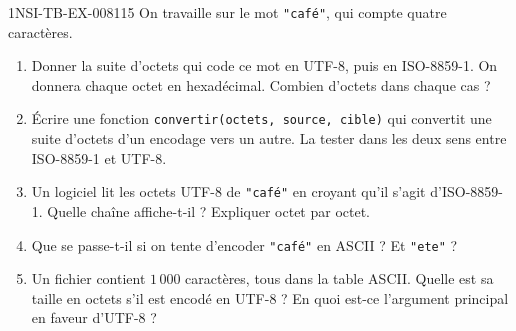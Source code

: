 \begin{exercice}{1NSI-TB-EX-008}{1}{15}
On travaille sur le mot \lstinline{"café"}, qui compte quatre caractères.
\begin{enumerate}
  \item Donner la suite d'octets qui code ce mot en UTF-8, puis en
    ISO-8859-1. On donnera chaque octet en hexadécimal. Combien d'octets dans
    chaque cas ?
  \item Écrire une fonction \lstinline{convertir(octets, source, cible)} qui
    convertit une suite d'octets d'un encodage vers un autre. La tester dans les
    deux sens entre ISO-8859-1 et UTF-8.
  \item Un logiciel lit les octets UTF-8 de \lstinline{"café"} en croyant qu'il
    s'agit d'ISO-8859-1. Quelle chaîne affiche-t-il ? Expliquer octet par octet.
  \item Que se passe-t-il si on tente d'encoder \lstinline{"café"} en ASCII ?
    Et \lstinline{"ete"} ?
  \item Un fichier contient $1\,000$ caractères, tous dans la table ASCII. Quelle
    est sa taille en octets s'il est encodé en UTF-8 ? En quoi est-ce l'argument
    principal en faveur d'UTF-8 ?
\end{enumerate}
\end{exercice}
